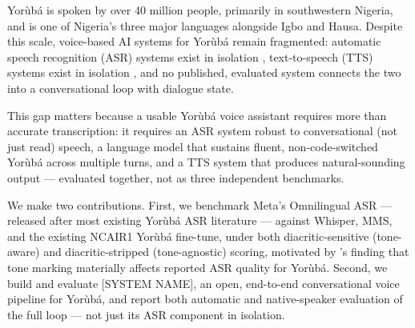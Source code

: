 Yor\`ub\'a is spoken by over 40 million people, primarily in southwestern
Nigeria, and is one of Nigeria's three major languages alongside Igbo and
Hausa. Despite this scale, voice-based AI systems for Yor\`ub\'a remain
fragmented: automatic speech recognition (ASR) systems exist in isolation
\citep{ncair-yoruba-asr}, text-to-speech (TTS) systems exist in isolation
\citep{yarngpt2}, and no published, evaluated system connects the two into
a conversational loop with dialogue state.

This gap matters because a usable Yor\`ub\'a voice assistant requires more
than accurate transcription: it requires an ASR system robust to
conversational (not just read) speech, a language model that sustains
fluent, non-code-switched Yor\`ub\'a across multiple turns, and a TTS system
that produces natural-sounding output — evaluated together, not as three
independent benchmarks.

We make two contributions. First, we benchmark Meta's Omnilingual ASR
\citep{omnilingual2025} — released after most existing Yor\`ub\'a ASR
literature — against Whisper, MMS, and the existing NCAIR1 Yor\`ub\'a
fine-tune, under both diacritic-sensitive (tone-aware) and
diacritic-stripped (tone-agnostic) scoring, motivated by
\citet{tone-yoruba-asr}'s finding that tone marking materially affects
reported ASR quality for Yor\`ub\'a. Second, we build and evaluate
[SYSTEM NAME], an open, end-to-end conversational voice pipeline for
Yor\`ub\'a, and report both automatic and native-speaker evaluation of the
full loop — not just its ASR component in isolation.

